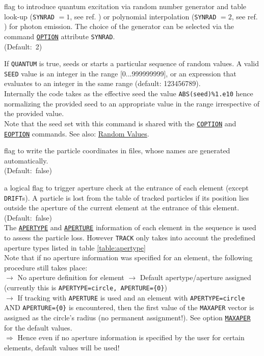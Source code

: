 \begin{madlist}
   flag to introduce quantum excitation via random
  number generator and table look-up (\texttt{SYNRAD} $=1$, see ref. \cite{roy1990}) or polynomial
  interpolation (\texttt{SYNRAD} $=2$, see ref. \cite{hbu2007}) for photon emission.
  The choice of the generator can be selected via the command
  \hyperref[sec:option]{\texttt{OPTION}} attribute \texttt{SYNRAD}. \\ (Default:~2)

   If \texttt{QUANTUM} is true, seeds or starts a
  particular sequence of random values. 
  A valid \texttt{SEED} value is an integer in the range
  [0...999999999], or an expression that evaluates to an integer in the
  same range (default: 123456789). \\
  Internally the code takes as the effective seed the value
  \texttt{ABS(seed)\%1.e10} hence normalizing the provided seed to an
  appropriate value in the range irrespective of the provided value. \\
  Note that the seed set with this command is shared with the
  \hyperref[sec:coption]{\texttt{COPTION}} and
  \hyperref[sec:coption]{\texttt{EOPTION}} commands. See also:
  \hyperref[subsubsec:random]{Random Values}. 

   flag to write the particle coordinates in files, whose
  names are generated automatically. \\ (Default:~false)

   a logical flag to trigger aperture check at the entrance 
  of each element (except \texttt{DRIFT}s). A particle is lost from the table of 
  tracked particles if its position lies outside the aperture of the current 
  element at the entrance of this element. \\ 
  (Default:~false) \\
  
  The \hyperref[chap:aperture]{\texttt{APERTYPE}} and 
  \hyperref[chap:aperture]{\texttt{APERTURE}} information of each element 
  in the sequence is used to assess the particle loss. 
  However \texttt{TRACK} only takes into account the predefined aperture 
  types listed in table \ref{table:apertype}
  \\
  
  Note that if no aperture information was specified for an element, 
  the following procedure still takes place:
  \\
  $\rightarrow$ No aperture definition for element $\rightarrow$ 
  Default apertype/aperture assigned (currently this is   
  \texttt{APERTYPE=circle, APERTURE=\{0\}}) 
  \\ $\rightarrow$  
  If tracking with \texttt{APERTURE} is used and an
  element with \texttt{APERTYPE=circle} AND \texttt{APERTURE=\{0\}}  
  is encountered, then the first value of the \texttt{MAXAPER} vector
  is assigned as the circle's radius (no permanent assignment!). 
  See option \hyperref[sec:run]{\texttt{MAXAPER}} for the default values. 
  \\ $\Rightarrow$
  Hence even if no aperture information is specified by the user for
  certain elements, default values will be used! 



\end{madlist}
